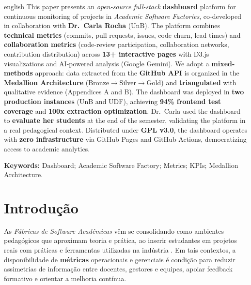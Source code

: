 \documentclass[
	12pt,
	openright,
	oneside,
	a4paper,
	brazil
]{abntex2}
\begin{document}
\begin{resumo}[Abstract]
\begin{otherlanguage*}{english}
This paper presents an \textit{open-source full-stack} \textbf{dashboard} platform for continuous monitoring of projects in \textit{Academic Software Factories}, co-developed in collaboration with \textbf{Dr.\ Carla Rocha} (UnB). The platform combines \textbf{technical metrics} (commits, pull requests, issues, code churn, lead times) and \textbf{collaboration metrics} (code-review participation, collaboration networks, contribution distribution) across \textbf{13+ interactive pages} with D3.js visualizations and AI-powered analysis (Google Gemini). We adopt a \textbf{mixed-methods} approach: data extracted from the \textbf{GitHub API} is organized in the \textbf{Medallion Architecture} (Bronze$\rightarrow$Silver$\rightarrow$Gold) and \textbf{triangulated} with qualitative evidence (Appendices A and B). The dashboard was deployed in \textbf{two production instances} (UnB and UDF), achieving \textbf{94\% frontend test coverage} and \textbf{100x extraction optimization}. Dr.\ Carla used the dashboard to \textbf{evaluate her students} at the end of the semester, validating the platform in a real pedagogical context. Distributed under \textbf{GPL v3.0}, the dashboard operates with \textbf{zero infrastructure} via GitHub Pages and GitHub Actions, democratizing access to academic analytics.

\textbf{Keywords:} Dashboard; Academic Software Factory; Metrics; KPIs; Medallion Architecture.
\end{otherlanguage*}
\end{resumo}

\tableofcontents*
\cleardoublepage

\textual

\section{Introdução}

As \textit{Fábricas de Software Acadêmicas} vêm se consolidando como ambientes pedagógicos que aproximam teoria e prática, ao inserir estudantes em projetos reais com práticas e ferramentas utilizadas na indústria \cite{dos2021experiencia,romanha2016modelo,neto2017relato,oliveira2017conduccao,romanha2015fabrica,almeida2006liccoes}. Em tais contextos, a disponibilidade de \textbf{métricas} operacionais e gerenciais é condição para reduzir assimetrias de informação entre docentes, gestores e equipes, apoiar feedback formativo e orientar a melhoria contínua.
\end{document}

